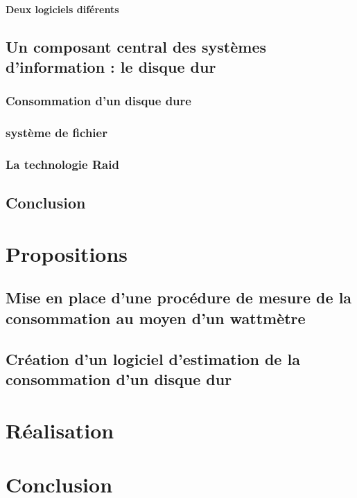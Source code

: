 \documentclass[a4paper, 11pt]{report}
\begin{document}
			\subsubsection{Deux logiciels diférents}
	
	\section{Un composant central des systèmes d'information : le disque dur}
		\subsection{Consommation d'un disque dure}
		
		\subsection{système de fichier}
		
		\subsection{La technologie Raid}
	
	\section{Conclusion}

\chapter{Propositions}
	\section{Mise en place d'une procédure de mesure de la consommation au moyen d'un wattmètre}
	
	\section{Création d'un logiciel d'estimation de la consommation d'un disque dur}
	

\chapter{Réalisation}

\chapter{Conclusion}



\listoffigures{}
\listoftables{}

\appendix
\end{document}
